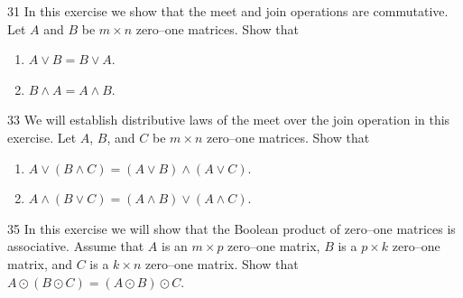 \documentclass[11pt]{article}
\begin{document}
\begin{exercise}{31}
    In this exercise we show that the meet and join operations are
    commutative. Let $A$ and $B$ be $m \times n$ zero--one matrices.
    Show that
    \begin{enumerate}[label=(\alph*)]
        \item $A \vee B = B \vee A$.
        \item $B \wedge A = A \wedge B$.
    \end{enumerate}
\end{exercise}

\begin{exercise}{33}
    We will establish distributive laws of the meet over the join
    operation in this exercise. Let $A$, $B$, and $C$ be $m \times n$
    zero--one matrices. Show that
    \begin{enumerate}[label=(\alph*)]
        \item $A \vee (B \wedge C) = (A \vee B) \wedge (A \vee C)$.
        \item $A \wedge (B \vee C) = (A \wedge B) \vee (A \wedge C)$.
    \end{enumerate}
\end{exercise}

\begin{exercise}{35}
    In this exercise we will show that the Boolean product of
    zero--one matrices is associative. Assume that $A$ is an
    $m \times p$ zero--one matrix, $B$ is a $p \times k$ zero--one
    matrix, and $C$ is a $k \times n$ zero--one matrix. Show that
    $A \odot (B \odot C) = (A \odot B) \odot C$.
\end{exercise}
\end{document}
